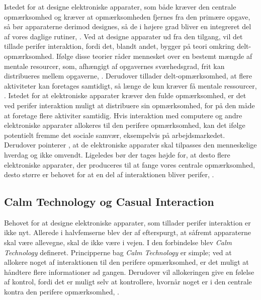 Istedet for at designe elektroniske apparater, som både kræver den centrale opmærksomhed og kræver at opmærksomheden fjernes fra den primære opgave, så bør apparaterne derimod designes, så de i højere grad bliver en integreret del af vores daglige rutiner, \parencite[s. 239]{PDF:PICharacteristicsAndConsiderations}. Ved at designe apparater ud fra den tilgang, vil det tillade perifer interaktion, fordi det, blandt andet, bygger på teori omkring delt-opmærksomhed. Ifølge disse teorier råder mennesket over en bestemt mængde af mentale resourcer, som, afhængigt af opgavernes sværhedsgrad, frit kan distribueres mellem opgaverne, \parencite[s. 240]{PDF:PICharacteristicsAndConsiderations}. Derudover tillader delt-opmærksomhed, at flere aktiviteter kan foretages samtidigt, så længe de kun kræver få mentale ressourcer, \parencite[s. 2]{PDF:FacilitatingPIDesignAndEvaluation}. Istedet for at elektroniske apparater kræver den fulde opmærksomhed, er det ved perifer interaktion muligt at distribuere sin opmærksomhed, for på den måde at foretage flere aktiviter samtidig. Hvis interaktion med computere og andre elektroniske apparater allokeres til den perifere opmærksomhed, kan det ifølge \textcite[s. 11]{PDF:TheComputerWeiser} potentielt fremme det sociale samvær, eksempelvis på arbejdsmarkedet. Derudover pointerer \textcite[s. 11]{PDF:TheComputerWeiser}, at de elektroniske apparater skal tilpasses den menneskelige hverdag og ikke omvendt. Ligeledes bør der tages højde for, at desto flere elektroniske apparater, der produceres til at fange vores centrale opmærksomhed, desto større er behovet for at en del af interaktionen bliver perifer, \parencite[s. 240]{PDF:PICharacteristicsAndConsiderations}.
\newpage
%
\subsection{Calm Technology og Casual Interaction}
\label{CasualOgCalm}
%
Behovet for at designe elektroniske apparater, som tillader perifer interaktion er ikke nyt. Allerede i halvfemserne blev der af \textcite[s. 3]{PDF:TheComingAgeOfCalmTech} efterspurgt, at såfremt apparaterne skal være allevegne, skal de ikke være i vejen. I den forbindelse blev \textit{Calm Technology} defineret. Principperne bag \textit{Calm Technology} er simple; ved at allokere noget af interaktionen til den perifere opmærksomhed, er det muligt at håndtere flere informationer ad gangen. Derudover vil allokeringen give en følelse af kontrol, fordi det er muligt selv at kontrollere, hvornår noget er i den centrale kontra den perifere opmærksomhed, \parencite[s. 4]{PDF:TheComingAgeOfCalmTech}. 

